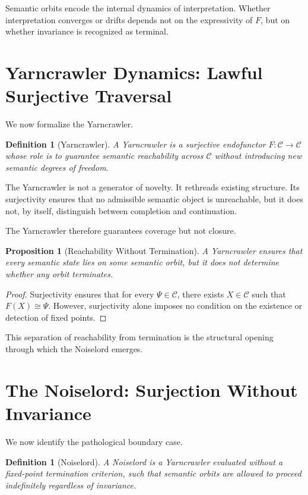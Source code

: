 \documentclass[12pt]{article}
\newtheorem{definition}[theorem]{Definition}
\newtheorem{proposition}[theorem]{Proposition}
\theoremstyle{remark}
\begin{document}
Semantic orbits encode the internal dynamics of interpretation. Whether interpretation converges or drifts depends not on the expressivity of $F$, but on whether invariance is recognized as terminal.

\section{Yarncrawler Dynamics: Lawful Surjective Traversal}

We now formalize the Yarncrawler.

\begin{definition}[Yarncrawler]
A Yarncrawler is a surjective endofunctor $F : \mathcal{C} \to \mathcal{C}$ whose role is to guarantee semantic reachability across $\mathcal{C}$ without introducing new semantic degrees of freedom.
\end{definition}

The Yarncrawler is not a generator of novelty. It rethreads existing structure. Its surjectivity ensures that no admissible semantic object is unreachable, but it does not, by itself, distinguish between completion and continuation.

The Yarncrawler therefore guarantees coverage but not closure.

\begin{proposition}[Reachability Without Termination]
A Yarncrawler ensures that every semantic state lies on some semantic orbit, but it does not determine whether any orbit terminates.
\end{proposition}

\begin{proof}
Surjectivity ensures that for every $\Psi \in \mathcal{C}$, there exists $X \in \mathcal{C}$ such that $F(X) \cong \Psi$. However, surjectivity alone imposes no condition on the existence or detection of fixed points.
\end{proof}

This separation of reachability from termination is the structural opening through which the Noiselord emerges.

\section{The Noiselord: Surjection Without Invariance}

We now identify the pathological boundary case.

\begin{definition}[Noiselord]
A Noiselord is a Yarncrawler evaluated without a fixed-point termination criterion, such that semantic orbits are allowed to proceed indefinitely regardless of invariance.
\end{definition}
\end{document}
